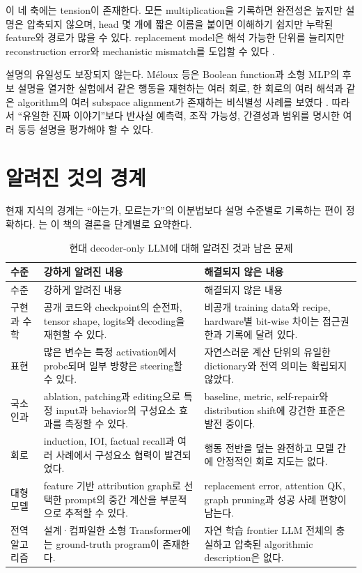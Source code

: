 이 네 축에는 tension이 존재한다.
모든 multiplication을 기록하면 완전성은 높지만 설명은 압축되지 않으며, head 몇 개에 짧은 이름을 붙이면 이해하기 쉽지만 누락된 feature와 경로가 많을 수 있다.
replacement model은 해석 가능한 단위를 늘리지만 reconstruction error와 mechanistic mismatch를 도입할 수 있다 \citep{ameisen2025circuittracing}.

설명의 유일성도 보장되지 않는다.
Méloux 등은 Boolean function과 소형 MLP의 후보 설명을 열거한 실험에서 같은 행동을 재현하는 여러 회로, 한 회로의 여러 해석과 같은 algorithm의 여러 subspace alignment가 존재하는 비식별성 사례를 보였다 \citep{meloux2025identifiable}.
따라서 ``유일한 진짜 이야기''보다 반사실 예측력, 조작 가능성, 간결성과 범위를 명시한 여러 동등 설명을 평가해야 할 수 있다.

\section{알려진 것의 경계}

현재 지식의 경계는 ``아는가, 모르는가''의 이분법보다 설명 수준별로 기록하는 편이 정확하다.
는 이 책의 결론을 단계별로 요약한다.

\begin{longtable}{@{}p{}p{}p{}@{}}
\caption{현대 decoder-only LLM에 대해 알려진 것과 남은 문제}
\label{tab:known-boundary}\\
\toprule
수준 & 강하게 알려진 내용 & 해결되지 않은 내용 \\
\midrule
\endfirsthead
\toprule
수준 & 강하게 알려진 내용 & 해결되지 않은 내용 \\
\midrule
\endhead
구현과 수학 & 공개 코드와 checkpoint의 순전파, tensor shape, logits와 decoding을 재현할 수 있다. & 비공개 training data와 recipe, hardware별 bit-wise 차이는 접근권한과 기록에 달려 있다. \\
표현 & 많은 변수는 특정 activation에서 probe되며 일부 방향은 steering할 수 있다. & 자연스러운 계산 단위의 유일한 dictionary와 전역 의미는 확립되지 않았다. \\
국소 인과 & ablation, patching과 editing으로 특정 input과 behavior의 구성요소 효과를 측정할 수 있다. & baseline, metric, self-repair와 distribution shift에 강건한 표준은 발전 중이다. \\
회로 & induction, IOI, factual recall과 여러 사례에서 구성요소 협력이 발견되었다. & 행동 전반을 덮는 완전하고 모델 간에 안정적인 회로 지도는 없다. \\
대형 모델 & feature 기반 attribution graph로 선택한 prompt의 중간 계산을 부분적으로 추적할 수 있다. & replacement error, attention QK, graph pruning과 성공 사례 편향이 남는다. \\
전역 알고리즘 & 설계·컴파일한 소형 Transformer에는 ground-truth program이 존재한다. & 자연 학습 frontier LLM 전체의 충실하고 압축된 algorithmic description은 없다. \\
\bottomrule
\end{longtable}

